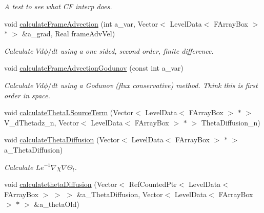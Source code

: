 \begin{DoxyCompactItemize}
\begin{DoxyCompactList}\small\item\em A test to see what C\-F interp does. \end{DoxyCompactList}\item 
\hypertarget{classamr_mushy_layer_a78d9b1fe087c0b66f2644a1edd708dcf}{void \hyperlink{classamr_mushy_layer_a78d9b1fe087c0b66f2644a1edd708dcf}{calculate\-Frame\-Advection} (int a\-\_\-var, Vector$<$ Level\-Data$<$ F\-Array\-Box $>$ $\ast$ $>$ \&a\-\_\-grad, Real frame\-Adv\-Vel)}\label{classamr_mushy_layer_a78d9b1fe087c0b66f2644a1edd708dcf}

\begin{DoxyCompactList}\small\item\em Calculate $ V d \phi / dt $ using a one sided, second order, finite difference. \end{DoxyCompactList}\item 
\hypertarget{classamr_mushy_layer_aadf951416861e7913d032f10e034f1fb}{void \hyperlink{classamr_mushy_layer_aadf951416861e7913d032f10e034f1fb}{calculate\-Frame\-Advection\-Godunov} (const int a\-\_\-var)}\label{classamr_mushy_layer_aadf951416861e7913d032f10e034f1fb}

\begin{DoxyCompactList}\small\item\em Calculate $ V d \phi / dt $ using a Godunov (flux conservative) method. Think this is first order in space. \end{DoxyCompactList}\item 
void \hyperlink{classamr_mushy_layer_a75ef657901ce964fd2ea6b0d92e9c65f}{calculate\-Theta\-L\-Source\-Term} (Vector$<$ Level\-Data$<$ F\-Array\-Box $>$ $\ast$ $>$ V\-\_\-d\-Thetadz\-\_\-n, Vector$<$ Level\-Data$<$ F\-Array\-Box $>$ $\ast$ $>$ Theta\-Diffusion\-\_\-n)
\item 
\hypertarget{classamr_mushy_layer_a3db516a1b0dc1b9e7aeaa17f47157c9c}{void \hyperlink{classamr_mushy_layer_a3db516a1b0dc1b9e7aeaa17f47157c9c}{calculate\-Theta\-Diffusion} (Vector$<$ Level\-Data$<$ F\-Array\-Box $>$ $\ast$ $>$ a\-\_\-\-Theta\-Diffusion)}\label{classamr_mushy_layer_a3db516a1b0dc1b9e7aeaa17f47157c9c}

\begin{DoxyCompactList}\small\item\em Calculate $ Le^{-1} \nabla \chi \nabla \Theta_l $. \end{DoxyCompactList}\item 
\hypertarget{classamr_mushy_layer_aa6d3cfa6c1b4bfa2938d9ccbc44f516e}{void \hyperlink{classamr_mushy_layer_aa6d3cfa6c1b4bfa2938d9ccbc44f516e}{calculatetheta\-Diffusion} (Vector$<$ Ref\-Counted\-Ptr$<$ Level\-Data$<$ F\-Array\-Box $>$ $>$ $>$ \&a\-\_\-\-Theta\-Diffusion, Vector$<$ Level\-Data$<$ F\-Array\-Box $>$ $\ast$ $>$ \&a\-\_\-theta\-Old)}\label{classamr_mushy_layer_aa6d3cfa6c1b4bfa2938d9ccbc44f516e}


\end{DoxyCompactItemize}

